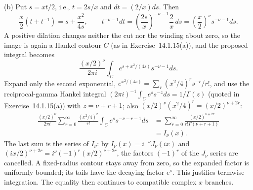 (b) 
Put $s=xt/2$, i.e., $t=2s/x$ and $dt=(2/x)ds$. Then
\[
\frac x2(t+t^{-1})=s+\frac{x^2}{4s},\qquad
t^{-\nu-1}dt=\left(\frac{2s}x\right)^{-\nu-1}\frac2x\,ds
=\left(\frac x2\right)^\nu s^{-\nu-1}ds.
\]
A positive dilation changes neither the cut nor the winding about
zero, so the image is again a Hankel contour $C$ (as in
Exercise~14.1.15(a)), and the proposed integral becomes
\[
\frac{(x/2)^\nu}{2\pi i}\int_C
e^{s+x^2/(4s)}s^{-\nu-1}ds.
\]
Expand only the second exponential,
$e^{x^2/(4s)}=\sum_r(x^2/4)^rs^{-r}/r!$, and use the
reciprocal-gamma Hankel integral
$(2\pi i)^{-1}\int_Ce^ss^{-z}ds=1/\Gamma(z)$ (quoted in
Exercise~14.1.15(a)) with $z=\nu+r+1$; also
$(x/2)^\nu(x^2/4)^r=(x/2)^{\nu+2r}$:
\begin{align*}
\frac{(x/2)^\nu}{2\pi i}\sum_{r=0}^\infty
\frac{(x^2/4)^r}{r!}\int_Ce^ss^{-\nu-r-1}ds
&=\sum_{r=0}^\infty
\frac{(x/2)^{\nu+2r}}{r!\Gamma(\nu+r+1)}\\
&=\boxed{I_\nu(x)}.
\end{align*}
The last sum is the series of $I_\nu$: by $I_\nu(x)=i^{-\nu}J_\nu(ix)$
and $(ix/2)^{\nu+2r}=i^\nu(-1)^r(x/2)^{\nu+2r}$, the factors
$(-1)^r$ of the $J_\nu$ series are cancelled.
A fixed-radius contour stays away from zero, so the expanded
factor is uniformly bounded; its tails have the decaying factor
$e^s$. This justifies termwise integration. The equality then
continues to compatible complex $x$ branches.

